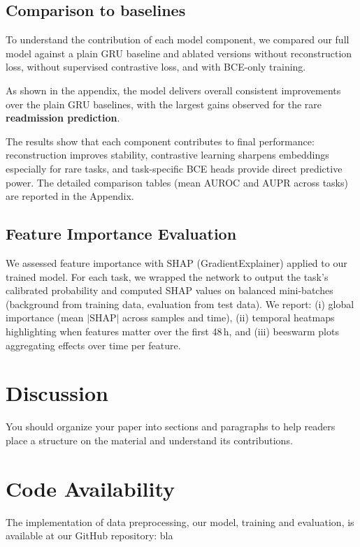 \documentclass{article}
\theoremstyle{plain}
\theoremstyle{definition}
\theoremstyle{remark}
\begin{document}
\subsection{Comparison to baselines}

To understand the contribution of each model component, we compared our full model against 
a plain GRU baseline and ablated versions without reconstruction loss, without supervised contrastive loss, 
and with BCE-only training. 

As shown in the appendix, the model delivers overall consistent improvements over the plain GRU baselines, with the largest gains observed for the rare \textbf{readmission prediction}. 

The results show that each component contributes to final performance: reconstruction improves stability, 
contrastive learning sharpens embeddings especially for rare tasks, and task-specific BCE heads provide 
direct predictive power. The detailed comparison tables (mean AUROC and AUPR across tasks) are reported 
in the Appendix.

\subsection{Feature Importance Evaluation}
\label{sec:featimp}

We assessed feature importance with SHAP (GradientExplainer) applied to our trained model. 
For each task, we wrapped the network to output the task’s calibrated probability and computed SHAP values on 
balanced mini-batches (background from training data, evaluation from test data). We report: 
(i) global importance (mean $|\text{SHAP}|$ across samples and time), 
(ii) temporal heatmaps highlighting when features matter over the first 48\,h, and 
(iii) beeswarm plots aggregating effects over time per feature. 


\section{Discussion}

You should organize your paper into sections and paragraphs to help
readers place a structure on the material and understand its
contributions.

\section{Code Availability}

The implementation of data preprocessing, our model, training and evaluation, is available at our GitHub repository:
bla
\end{document}
